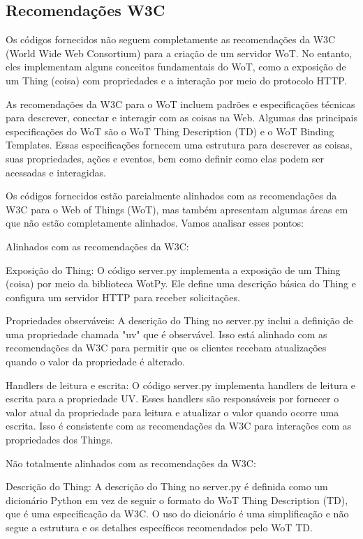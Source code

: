 \subsection{Recomendações W3C}

Os códigos fornecidos não seguem completamente as recomendações da W3C (World Wide Web Consortium) para a criação de um servidor WoT. No entanto, eles implementam alguns conceitos fundamentais do WoT, como a exposição de um Thing (coisa) com propriedades e a interação por meio do protocolo HTTP.

As recomendações da W3C para o WoT incluem padrões e especificações técnicas para descrever, conectar e interagir com as coisas na Web. Algumas das principais especificações do WoT são o WoT Thing Description (TD) e o WoT Binding Templates. Essas especificações fornecem uma estrutura para descrever as coisas, suas propriedades, ações e eventos, bem como definir como elas podem ser acessadas e interagidas.

Os códigos fornecidos estão parcialmente alinhados com as recomendações da W3C para o Web of Things (WoT), mas também apresentam algumas áreas em que não estão completamente alinhados. Vamos analisar esses pontos:

Alinhados com as recomendações da W3C:

Exposição do Thing: O código server.py implementa a exposição de um Thing (coisa) por meio da biblioteca WotPy. Ele define uma descrição básica do Thing e configura um servidor HTTP para receber solicitações.

Propriedades observáveis: A descrição do Thing no server.py inclui a definição de uma propriedade chamada "uv" que é observável. Isso está alinhado com as recomendações da W3C para permitir que os clientes recebam atualizações quando o valor da propriedade é alterado.

Handlers de leitura e escrita: O código server.py implementa handlers de leitura e escrita para a propriedade UV. Esses handlers são responsáveis por fornecer o valor atual da propriedade para leitura e atualizar o valor quando ocorre uma escrita. Isso é consistente com as recomendações da W3C para interações com as propriedades dos Things.

Não totalmente alinhados com as recomendações da W3C:

Descrição do Thing: A descrição do Thing no server.py é definida como um dicionário Python em vez de seguir o formato do WoT Thing Description (TD), que é uma especificação da W3C. O uso do dicionário é uma simplificação e não segue a estrutura e os detalhes específicos recomendados pelo WoT TD.

